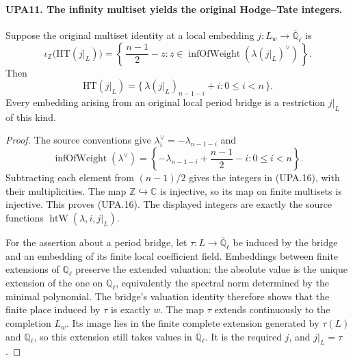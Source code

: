 \paragraph{UPA11. The infinity multiset yields the original Hodge--Tate integers.}
\label{claim:UPA11}
Suppose the original multiset identity at a local embedding
$j:L_w\to\overline{\mathbb Q}_\ell$ is
\[
 \iota_{\mathbb Z}\bigl(\mathrm{HT}(j|_L)\bigr)
   =\left\{\,\frac{n-1}{2}-z:
                    z\in\operatorname{infOfWeight}(\lambda(j|_L)^\vee)
     \,\right\}.
 \tag{UPA.15}
\]
Then
\[
 \mathrm{HT}(j|_L)
       =\{\,\lambda(j|_L)_{n-1-i}+i:0\leq i<n\,\}.
 \tag{UPA.16}
\]
Every embedding arising from an original local period bridge
is a restriction $j|_L$ of this kind.
\begin{proof}
The source conventions give
$\lambda^\vee_i=-\lambda_{n-1-i}$ and
\[
 \operatorname{infOfWeight}(\lambda^\vee)
   =\left\{-\lambda_{n-1-i}+\frac{n-1}{2}-i:0\leq i<n\right\}.
 \tag{UPA.17}
\]
Subtracting each element from $(n-1)/2$ gives the integers
in (UPA.16), with their multiplicities.  The map
$\mathbb Z\hookrightarrow\mathbb C$ is injective, so its
map on finite multisets is injective.  This proves
(UPA.16).  The displayed integers are exactly the
source functions $\operatorname{htW}(\lambda,i,j|_L)$.

For the assertion about a period bridge, let $\tau:L\to
\overline{\mathbb Q}_\ell$ be induced by the bridge and
an embedding of its finite local coefficient field.
Embeddings between finite extensions of $\mathbb Q_\ell$
preserve the extended valuation: the absolute value is
the unique extension of the one on $\mathbb Q_\ell$,
equivalently the spectral norm determined by the minimal
polynomial.  The bridge's valuation identity therefore
shows that the finite place induced by $\tau$ is exactly
$w$.  The map $\tau$ extends continuously to the completion
$L_w$.  Its image lies in the finite complete extension
generated by $\tau(L)$ and $\mathbb Q_\ell$, so this
extension still takes values in $\overline{\mathbb Q}_\ell$.
It is the required $j$, and $j|_L=\tau$.
\end{proof}

